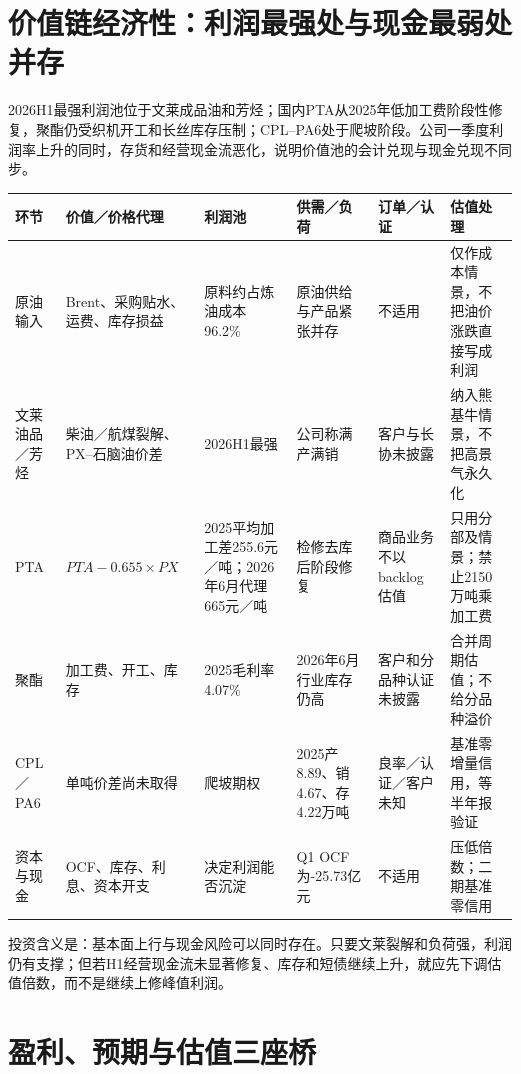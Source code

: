 \section{价值链经济性：利润最强处与现金最弱处并存}

2026H1最强利润池位于文莱成品油和芳烃；国内PTA从2025年低加工费阶段性修复，聚酯仍受织机开工和长丝库存压制；CPL--PA6处于爬坡阶段。公司一季度利润率上升的同时，存货和经营现金流恶化，说明价值池的会计兑现与现金兑现不同步。

\begin{exhibitbox}[价值链经济性与估值信用]
\small
\noindent\begin{tabularx}{\textwidth}{L{1.85cm}L{2.25cm}L{2.25cm}L{2.0cm}L{2.1cm}X}
\toprule
\textbf{环节} & \textbf{价值／价格代理} & \textbf{利润池} & \textbf{供需／负荷} & \textbf{订单／认证} & \textbf{估值处理} \\
\midrule
原油输入 & Brent、采购贴水、运费、库存损益 & 原料约占炼油成本96.2\% & 原油供给与产品紧张并存 & 不适用 & 仅作成本情景，不把油价涨跌直接写成利润 \\
文莱油品／芳烃 & 柴油／航煤裂解、PX--石脑油价差 & 2026H1最强 & 公司称满产满销 & 客户与长协未披露 & 纳入熊基牛情景，不把高景气永久化 \\
PTA & $PTA-0.655\times PX$ & 2025平均加工差255.6元／吨；2026年6月代理665元／吨 & 检修去库后阶段修复 & 商品业务不以backlog估值 & 只用分部及情景；禁止2150万吨乘加工费 \\
聚酯 & 加工费、开工、库存 & 2025毛利率4.07\% & 2026年6月行业库存仍高 & 客户和分品种认证未披露 & 合并周期估值；不给分品种溢价 \\
CPL／PA6 & 单吨价差尚未取得 & 爬坡期权 & 2025产8.89、销4.67、存4.22万吨 & 良率／认证／客户未知 & 基准零增量信用，等半年报验证 \\
资本与现金 & OCF、库存、利息、资本开支 & 决定利润能否沉淀 & Q1 OCF为-25.73亿元 & 不适用 & 压低倍数；二期基准零信用 \\
\bottomrule
\end{tabularx}
\end{exhibitbox}

投资含义是：基本面上行与现金风险可以同时存在。只要文莱裂解和负荷强，利润仍有支撑；但若H1经营现金流未显著修复、库存和短债继续上升，就应先下调估值倍数，而不是继续上修峰值利润。

\section{盈利、预期与估值三座桥}

